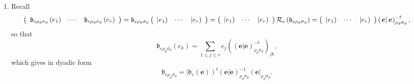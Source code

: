 \documentclass[aps,preprint]{revtex4}
\begin{document}
\begin{enumerate}
\item Recall 
\begin{equation}
\left( 
\begin{array}{ccc}
\mathfrak{b}_{e\rho _{d}\sigma _{d}}\left( e_{1}\right) & \cdots & \mathfrak{%
b}_{e\rho _{d}\sigma _{d}}\left( e_{r}\right)%
\end{array}%
\right) =\mathfrak{b}_{e\rho _{d}\sigma _{d}}\left( 
\begin{array}{ccc}
\left\vert e_{1}\right) & \cdots & \left\vert e_{r}\right)%
\end{array}%
\right) =\left( 
\begin{array}{ccc}
\left\vert e_{1}\right) & \cdots & \left\vert e_{r}\right)%
\end{array}%
\right) \mathcal{R}_{e}\left( \mathfrak{b}_{e\rho _{d}\sigma _{d}}\right)
=\left( 
\begin{array}{ccc}
\left\vert e_{1}\right) & \cdots & \left\vert e_{r}\right)%
\end{array}%
\right) \left( \left. \boldsymbol{e}\right\vert \boldsymbol{e}\right) _{\rho
_{d}\sigma _{d}}^{-t},
\end{equation}%
so that 
\begin{equation}
\mathfrak{b}_{e\rho _{d}\sigma _{d}}\left( e_{k}\right) =\sum_{1\leq j\leq
r}e_{j}\left( \left( \left. \boldsymbol{e}\right\vert \boldsymbol{e}\right)
_{\rho _{d}\sigma _{d}}^{-t}\right) _{jk},
\end{equation}%
which gives in dyadic form 
\begin{equation}
\mathfrak{b}_{e\rho _{d}\sigma _{d}}=\left\vert \mathfrak{b}_{e}\left( 
\boldsymbol{e}\right) \right) ^{t}\left( \left. \boldsymbol{e}\right\vert 
\boldsymbol{e}\right) _{\rho _{d}\sigma _{d}}^{-1}\left( \boldsymbol{e}%
\right\vert _{\rho _{d}\sigma _{d}}.
\end{equation}


\end{enumerate}
\end{document}
